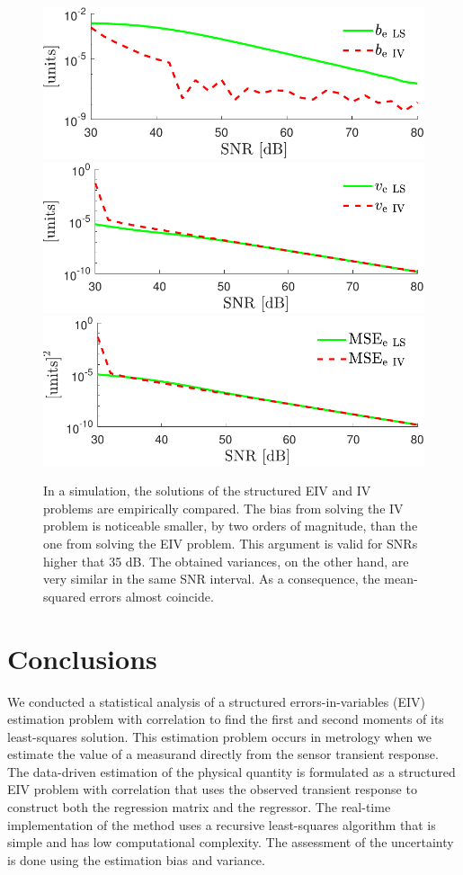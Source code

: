 \begin{figure}[!htpb]
  \centering
  \includegraphics[width=0.69\columnwidth]{./ChapterStatisticalAnalysis/fig/Fig_12.pdf}
  \includegraphics[width=0.69\columnwidth]{./ChapterStatisticalAnalysis/fig/Fig_13.pdf}
  \includegraphics[width=0.69\columnwidth]{./ChapterStatisticalAnalysis/fig/Fig_14.pdf}
  \caption{\label{fig:bvMSE_IV} \color{blue} In a simulation, the solutions of the structured EIV and IV problems are empirically compared. The bias from solving the IV problem is noticeable smaller, by two orders of magnitude, than the one from solving the EIV problem. This argument is valid for SNRs higher that 35 dB. The obtained variances, on the other hand, are very similar in the same SNR interval. As a consequence, the mean-squared errors almost coincide.}
\end{figure}


\color{black}


\section{Conclusions}

We conducted a statistical analysis of a structured errors-in-variables (EIV) estimation problem with correlation to find the first and second moments of its least-squares solution.
This estimation problem occurs in metrology when we estimate the value of a measurand directly from the sensor transient response.
The data-driven estimation of the physical quantity is formulated as a structured EIV problem with correlation that uses the observed transient response to construct both the regression matrix and the regressor.
The real-time implementation of the method uses a recursive least-squares algorithm that is simple and has low computational complexity.
The assessment of the uncertainty is done using the estimation bias and variance.

